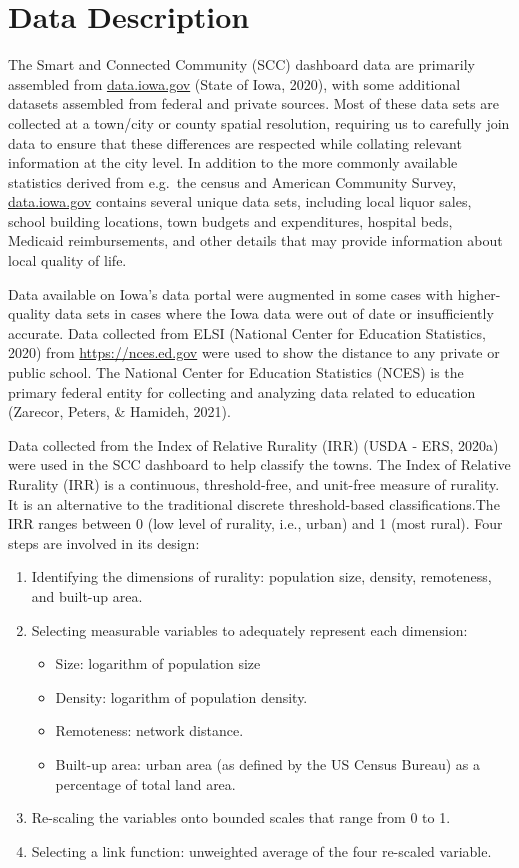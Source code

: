 \documentclass[print]{nuthesis}
\begin{document}
\hypertarget{data-description}{%
\section{Data Description}\label{data-description}}

The Smart and Connected Community (SCC) dashboard data are primarily assembled from \url{data.iowa.gov} (State of Iowa, 2020), with some additional datasets assembled from federal and private sources. Most of these data sets are collected at a town/city or county spatial resolution, requiring us to carefully join data to ensure that these differences are respected while collating relevant information at the city level. In addition to the more commonly available statistics derived from e.g.~the census and American Community Survey, \url{data.iowa.gov} contains several unique data sets, including local liquor sales, school building locations, town budgets and expenditures, hospital beds, Medicaid reimbursements, and other details that may provide information about local quality of life.

Data available on Iowa's data portal were augmented in some cases with higher-quality data sets in cases where the Iowa data were out of date or insufficiently accurate.
Data collected from ELSI (National Center for Education Statistics, 2020) from \url{https://nces.ed.gov} were used to show the distance to any private or public school. The National Center for Education Statistics (NCES) is the primary federal entity for collecting and analyzing data related to education (Zarecor, Peters, \& Hamideh, 2021).

Data collected from the Index of Relative Rurality (IRR) (USDA - ERS, 2020a) were used in the SCC dashboard to help classify the towns. The Index of Relative Rurality (IRR) is a continuous, threshold-free, and unit-free measure of rurality. It is an alternative to the traditional discrete threshold-based classifications.The IRR ranges between 0 (low level of rurality, i.e., urban) and 1 (most rural). Four steps are involved in its design:

\begin{enumerate}
\item Identifying the dimensions of rurality: population size, density, remoteness, and built-up area.
\item Selecting measurable variables to adequately represent each dimension:
    \begin{itemize}
        \item Size: logarithm of population size
        \item Density: logarithm of population density.
        \item Remoteness: network distance.
        \item Built-up area: urban area (as defined by the US Census Bureau) as a percentage of total land area.
    \end{itemize}
\item Re-scaling the variables onto bounded scales that range from 0 to 1.
\item Selecting a link function: unweighted average of the four re-scaled variable.
\end{enumerate}
\end{document}
